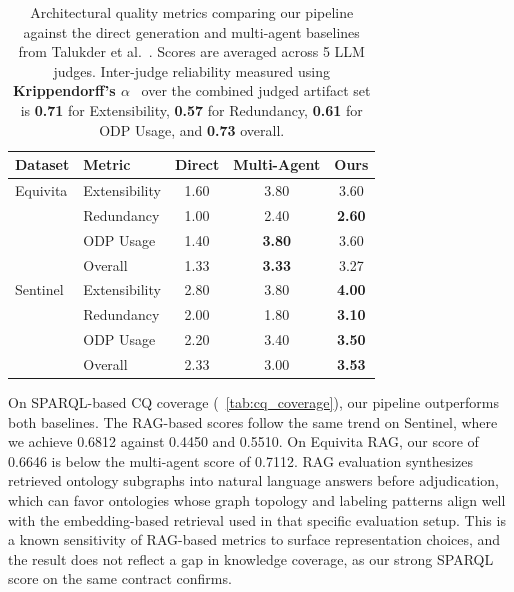 \documentclass[sigconf]{acmart}
\begin{document}
{
\setlength{\abovecaptionskip}{2pt}
\setlength{\belowcaptionskip}{-5pt}
\begin{table}[t]
\centering\small
\setlength{\tabcolsep}{5pt}
\caption{\normalfont Architectural quality metrics comparing our pipeline against the direct generation and
multi-agent baselines from Talukder et al.~\cite{talukder2026towards}. Scores are averaged across 5 LLM judges. Inter-judge reliability measured using \textbf{Krippendorff's $\alpha$}~\cite{hayes2007answering} over the combined judged artifact set is \textbf{0.71} for Extensibility,
\textbf{0.57} for Redundancy, \textbf{0.61} for ODP Usage, and \textbf{0.73} overall.}
\label{tab:quality_metrics}
\begin{tabular}{llccc}
\toprule
\textbf{Dataset} & \textbf{Metric} & \textbf{Direct} & \textbf{Multi-Agent} & \textbf{Ours} \\
\midrule
Equivita & Extensibility  & 1.60 & 3.80          & 3.60 \\
         & Redundancy     & 1.00 & 2.40          & \textbf{2.60} \\
         & ODP Usage      & 1.40 & \textbf{3.80} & 3.60 \\
         & Overall        & 1.33 & \textbf{3.33} & 3.27 \\
\midrule
Sentinel & Extensibility  & 2.80 & 3.80          & \textbf{4.00} \\
         & Redundancy     & 2.00 & 1.80          & \textbf{3.10} \\
         & ODP Usage      & 2.20 & 3.40          & \textbf{3.50} \\
         & Overall        & 2.33 & 3.00          & \textbf{3.53} \\
\bottomrule
\end{tabular}
\vspace{-1.25em}
\end{table}
}

On SPARQL-based CQ coverage (~\autoref{tab:cq_coverage}), our pipeline outperforms both baselines. The RAG-based scores follow the same trend on Sentinel, where we achieve 0.6812 against 0.4450 and 0.5510. On Equivita RAG, our score of 0.6646 is below the multi-agent score of 0.7112. RAG evaluation synthesizes retrieved ontology subgraphs into natural language answers before adjudication, which can favor ontologies whose graph topology and labeling patterns align well with the embedding-based retrieval used in that specific evaluation setup. This is a known sensitivity of RAG-based metrics to surface representation choices, and the result does not reflect a gap in knowledge coverage, as our strong SPARQL score on the same contract confirms.
\end{document}

